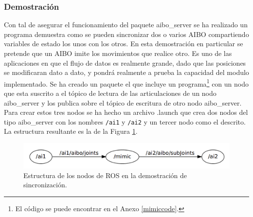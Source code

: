 \documentclass[12pt,a4paper,final,twoside]{article}
\begin{document}
\subsubsection{Demostración}
Con tal de asegurar el funcionamiento del paquete aibo{\_}server se ha realizado un programa demuestra como se pueden sincronizar dos o varios AIBO compartiendo variables de estado los unos con los otros. 
En esta demostración en particular se pretende que un AIBO imite los movimientos que realice otro. Es uno de las aplicaciones en que el flujo de datos es realmente grande, dado que las posiciones se modificaran dato a dato, y pondrá realmente a prueba la capacidad del modulo implementado.
Se ha creado un paquete el que incluye un programa\footnote{El código se puede encontrar en el Anexo \ref{mimiccode}.} con un nodo que esta suscrito a el tópico de lectura de las articulaciones de un nodo aibo{\_}server y los publica sobre el tópico de escritura de otro nodo aibo{\_}server. Para crear estos tres nodos se ha hecho un archivo .launch que crea dos nodos del tipo aibo{\_}server con los nombres \texttt{/ai1} y \texttt{/ai2} y un tercer nodo como el descrito. La estructura resultante es la de la Figura \ref{fig:mimic}.


\begin{figure}[H]
	\centering
    \includegraphics[scale=0.75]{images/mimic.pdf}
	 \caption{Estructura de los nodos de ROS en la demostración de sincronización.}
  \label{fig:mimic}
\end{figure}
\end{document}
